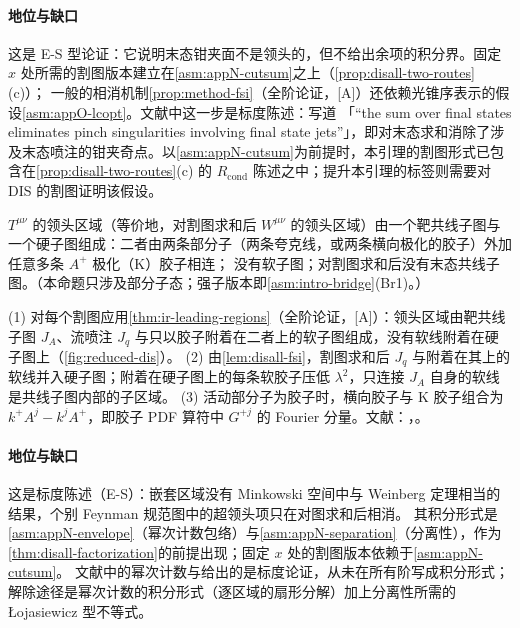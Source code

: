 \paragraph{地位与缺口}
这是 E-S 型论证：它说明末态钳夹面不是领头的，但不给出余项的积分界。固定 $x$ 处所需的割图版本建立在\cref{asm:appN-cutsum}之上（\cref{prop:disall-two-routes}(c)）；
一般的相消机制\cref{prop:method-fsi}（全阶论证，[A]）还依赖光锥序表示的假设\cref{asm:appO-lcopt}。文献中这一步是标度陈述：\cite[第~8.7~节]{CollinsSoperSterman1989}写道
「“the sum over final states eliminates pinch singularities involving final state jets”」，即对末态求和消除了涉及末态喷注的钳夹奇点。以\cref{asm:appN-cutsum}为前提时，本引理的割图形式已包含在\cref{prop:disall-two-routes}(c) 的 $R_{\mathrm{cond}}$ 陈述之中；提升本引理的标签则需要对 DIS 的割图证明该假设。

\begin{proposition}\label{prop:disall-regions}
$T^{\mu\nu}$ 的领头区域（等价地，对割图求和后 $W^{\mu\nu}$ 的领头区域）由一个靶共线子图与一个硬子图组成：二者由两条部分子（两条夸克线，或两条横向极化的胶子）外加任意多条 $A^+$ 极化（K）胶子相连；
没有软子图；对割图求和后没有末态共线子图。（本命题只涉及部分子态；强子版本即\cref{asm:intro-bridge}(Br1)。）
\end{proposition}

\begin{proofsketch}
(1) 对每个割图应用\cref{thm:ir-leading-regions}（全阶论证，[A]）：领头区域由靶共线子图 $J_A$、流喷注 $J_q$ 与只以胶子附着在二者上的软子图组成，没有软线附着在硬子图上（\cref{fig:reduced-dis}）。
(2) 由\cref{lem:disall-fsi}，割图求和后 $J_q$ 与附着在其上的软线并入硬子图；附着在硬子图上的每条软胶子压低 $\lambda^2$，只连接 $J_A$ 自身的软线是共线子图内部的子区域。
(3) 活动部分子为胶子时，横向胶子与 K 胶子组合为 $k^+A^j-k^jA^+$，即胶子 PDF 算符中 $G^{+j}$ 的 Fourier 分量。文献：\cite{LibbySterman1978a}，\cite[第~8.7~节]{CollinsSoperSterman1989}。
\end{proofsketch}

\paragraph{地位与缺口}
这是标度陈述（E-S）：嵌套区域没有 Minkowski 空间中与 Weinberg 定理相当的结果，个别 Feynman 规范图中的超领头项只在对图求和后相消。
其积分形式是\cref{asm:appN-envelope}（幂次计数包络）与\cref{asm:appN-separation}（分离性），作为\cref{thm:disall-factorization}的前提出现；固定 $x$ 处的割图版本依赖于\cref{asm:appN-cutsum}。
文献中的幂次计数\cite{LibbySterman1978a}与\cite[第~5~章]{Collins2011}给出的是标度论证，从未在所有阶写成积分形式；解除途径是幂次计数的积分形式（逐区域的扇形分解）加上分离性所需的 Łojasiewicz 型不等式。

